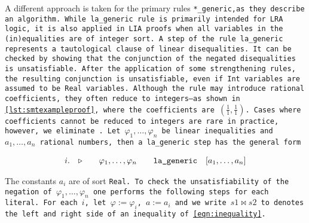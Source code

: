 A different approach is taken for the primary rules \tt{*\_generic},as they describe an algorithm.
While \tt{la\_generic rule} is primarily intended for LRA logic, it is also applied in LIA proofs when all variables in the (in)equalities are of integer sort.
A step of the rule \tt{la\_generic} represents a tautological clause of linear disequalities.  It can be checked by showing that the conjunction of
the negated disequalities is unsatisfiable. After the application of some strengthening rules, the resulting conjunction is unsatisfiable,
even if \lstinline[language=SMT,basicstyle=\ttfamily\footnotesize\upshape]{Int} variables are assumed to be \lstinline[language=SMT,basicstyle=\ttfamily\footnotesize\upshape]{Real} variables.
Although the rule may introduce rational coefficients, they often reduce to integers—as shown in \cref{lst:smtexampleproof}, where the coefficients are $(\frac{1}{1}, \frac{1}{1})$.
Cases where coefficients cannot be reduced to integers are rare in practice, however, we eliminate .
Let $\varphi_1,\dots, \varphi_n$ be linear inequalities and $a_1, \dots, a_n$ rational numbers, then a \tt{la\_generic} step has the general form

\[
\begin{matrix*}[c]
  i. & \ctxsep \quad & \varphi_1 , \dots , \varphi_n & \quad \tt{la\_generic}  & [a_1, \dots, a_n] \\
\end{matrix*}
\]

The constants $a_i$ are of sort \tt{Real}. To check the unsatisfiability of the negation of $\varphi_1, \dots, \varphi_n$ one performs the following steps for each literal. For each $i$, let $\varphi := \varphi_i$, $a := a_i$ and
we write $s1 \bowtie s2$ to denotes the left and right side of an inequality of \cref{eqn:inequality}.

